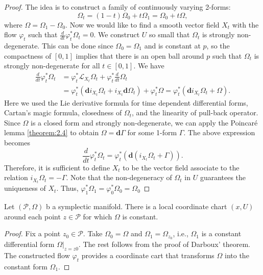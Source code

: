 \begin{proof}
The idea is to construct a family of continuously varying 2-forms:
\begin{equation*}
\Omega_t = (1-t)\Omega_0 + t\Omega_1 = \Omega_0 + t \Omega,
\end{equation*}
where $\Omega = \Omega_1 - \Omega_0$. Now we would like to find a smooth vector field $X_t$ with the flow $\varphi_t$ such that $\frac{d}{dt} \varphi_t^*\Omega_t = 0$. We construct $U$ so small that $\Omega_t$ is strongly non-degenerate. This can be done since $\Omega_0 = \Omega_1$ and is constant at $p$, so the compactness of $[0,1]$ implies that there is an open ball around $p$ such that $\Omega_t$ is strongly non-degenerate for all $t\in [0,1]$. We have
\begin{equation*}
\begin{aligned}
	\frac{d}{dt} \varphi_t^*\Omega_t &= \varphi_t^* \mathcal L_{X_t} \Omega_t + \varphi_t^* \frac{d}{dt} \Omega_t \\
	&= \varphi_t^*( \mathbf d i_{X_t}\Omega_t + i_{X_t} \mathbf d \Omega_t ) + \varphi_t^* \Omega
	= \varphi_t^*( \mathbf d i_{X_t}\Omega_t + \Omega ).
\end{aligned}
\end{equation*}
Here we used the Lie derivative formula for time dependent differential forms, Cartan's magic formula, closedness of $\Omega_t$, and the linearity of pull-back operator. Since $\Omega$ is a closed form and strongly non-degenerate, we can apply the Poincar\'e lemma \ref{theorem:2.4} to obtain $\Omega = \mathbf d \Gamma$ for some 1-form $\Gamma$. The above expression becomes
\begin{equation*}
	\frac{d}{dt} \varphi_t^*\Omega_t = \varphi_t^*( \mathbf d ( i_{X_t}\Omega_t + \Gamma ) ).
\end{equation*}
Therefore, it is sufficient to define $X_t$ to be the vector field associate to the relation $i_{X_t}\Omega_t = - \Gamma$. Note that the non-degeneracy of $\Omega_t$ in $U$ guarantees the uniqueness of $X_t$. Thus, $\varphi_1^* \Omega_1 = \varphi_0^* \Omega_0 = \Omega_0$
\end{proof}

\begin{corollary} \label{theorem:2.6}
Let $(\mathcal P, \Omega)$ b a symplectic manifold. There is a local coordinate chart $(x,U)$ around each point $z\in\mathcal P$ for which $\Omega$ is constant.
\end{corollary}
\begin{proof}
Fix a point $z_0 \in \mathcal P$. Take $\Omega_0 = \Omega$ and $\Omega_1 = \Omega_{z_0}$, i.e., $\Omega_1$ is a constant differential form $\Omega|_{z = z0}$. The rest follows from the proof of Darboux' theorem. The constructed flow $\varphi_t$ provides a coordinate cart that transforms $\Omega$ into the constant form $\Omega_1$.
\end{proof}


